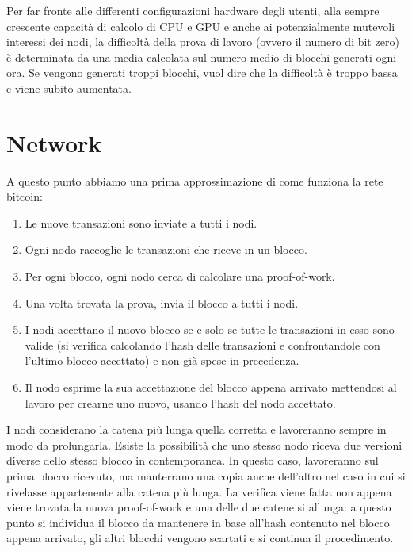 Per far fronte alle differenti configurazioni hardware degli utenti,
alla sempre crescente capacità di calcolo di CPU e GPU e anche ai
potenzialmente mutevoli interessi dei nodi, la difficoltà della prova di
lavoro (ovvero il numero di bit zero) è determinata da una media
calcolata sul numero medio di blocchi generati ogni ora. Se vengono
generati troppi blocchi, vuol dire che la difficoltà è troppo bassa e
viene subito aumentata.

\section{Network}\label{network}

A questo punto abbiamo una prima approssimazione di come funziona la
rete bitcoin:

\begin{enumerate}
\def\labelenumi{\arabic{enumi}.}
\itemsep1pt\parskip0pt
\item
  Le nuove transazioni sono inviate a tutti i nodi.
\item
  Ogni nodo raccoglie le transazioni che riceve in un blocco.
\item
  Per ogni blocco, ogni nodo cerca di calcolare una proof-of-work.
\item
  Una volta trovata la prova, invia il blocco a tutti i nodi.
\item
  I nodi accettano il nuovo blocco se e solo se tutte le transazioni in
  esso sono valide (si verifica calcolando l'hash delle transazioni e
  confrontandole con l'ultimo blocco accettato) e non già spese in
  precedenza.
\item
  Il nodo esprime la sua accettazione del blocco appena arrivato
  mettendosi al lavoro per crearne uno nuovo, usando l'hash del nodo
  accettato.
\end{enumerate}

I nodi considerano la catena più lunga quella corretta e lavoreranno
sempre in modo da prolungarla. Esiste la possibilità che uno stesso nodo
riceva due versioni diverse dello stesso blocco in contemporanea. In
questo caso, lavoreranno sul prima blocco ricevuto, ma manterrano una
copia anche dell'altro nel caso in cui si rivelasse appartenente alla
catena più lunga. La verifica viene fatta non appena viene trovata la
nuova proof-of-work e una delle due catene si allunga: a questo punto si
individua il blocco da mantenere in base all'hash contenuto nel blocco
appena arrivato, gli altri blocchi vengono scartati e si continua il
procedimento.


